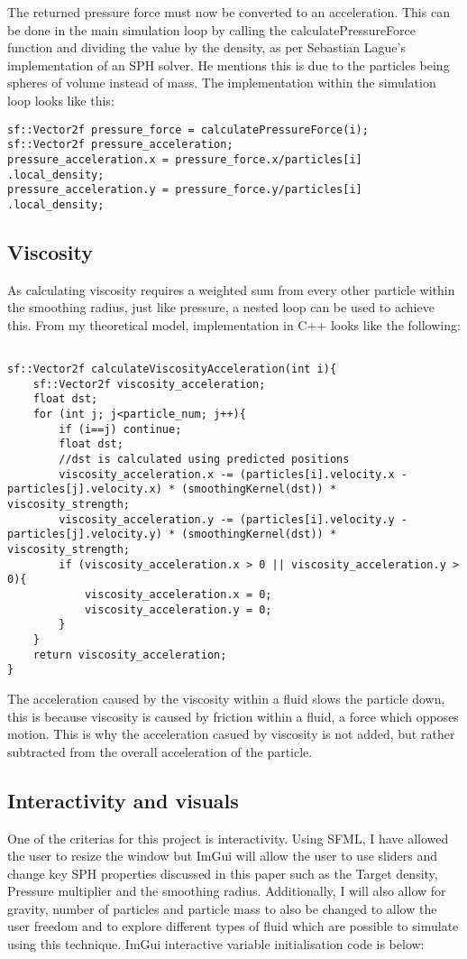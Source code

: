 \documentclass[write-up.tex]{subfiles}
\begin{document}
The returned pressure force must now be converted to an acceleration. This can be done in the main simulation loop by calling the calculatePressureForce function and dividing the value by the density, as per Sebastian Lague's implementation \cite{Lague} of an SPH solver. He mentions this is due to the particles being spheres of volume instead of mass. The implementation within the simulation loop looks like this:

\begin{lstlisting}
sf::Vector2f pressure_force = calculatePressureForce(i);
sf::Vector2f pressure_acceleration;
pressure_acceleration.x = pressure_force.x/particles[i]
.local_density;
pressure_acceleration.y = pressure_force.y/particles[i]
.local_density;
\end{lstlisting}
\subsection{Viscosity}
As calculating viscosity requires a weighted sum from every other particle within the smoothing radius, just like pressure, a nested loop can be used to achieve this. From my theoretical model, implementation in C++ looks like the following:
\begin{lstlisting}

sf::Vector2f calculateViscosityAcceleration(int i){
    sf::Vector2f viscosity_acceleration;
    float dst;
    for (int j; j<particle_num; j++){
        if (i==j) continue;
        float dst;
        //dst is calculated using predicted positions
        viscosity_acceleration.x -= (particles[i].velocity.x - particles[j].velocity.x) * (smoothingKernel(dst)) * viscosity_strength;
        viscosity_acceleration.y -= (particles[i].velocity.y - particles[j].velocity.y) * (smoothingKernel(dst)) * viscosity_strength;
        if (viscosity_acceleration.x > 0 || viscosity_acceleration.y > 0){
            viscosity_acceleration.x = 0;
            viscosity_acceleration.y = 0;
        }
    }
    return viscosity_acceleration;
}

\end{lstlisting}

The acceleration caused by the viscosity within a fluid slows the particle down, this is because viscosity is caused by friction within a fluid, a force which opposes motion. This is why the acceleration casued by viscosity is not added, but rather subtracted from the overall acceleration of the particle.
\subsection{Interactivity and visuals}
One of the criterias for this project is interactivity. Using SFML, I have allowed the user to resize the window but ImGui will allow the user to use sliders and change key SPH properties discussed in this paper such as the Target density, Pressure multiplier and the smoothing radius. Additionally, I will also allow for gravity, number of particles and particle mass to also be changed to allow the user freedom and to explore different types of fluid which are possible to simulate using this technique. ImGui interactive variable initialisation code is below:
\end{document}
